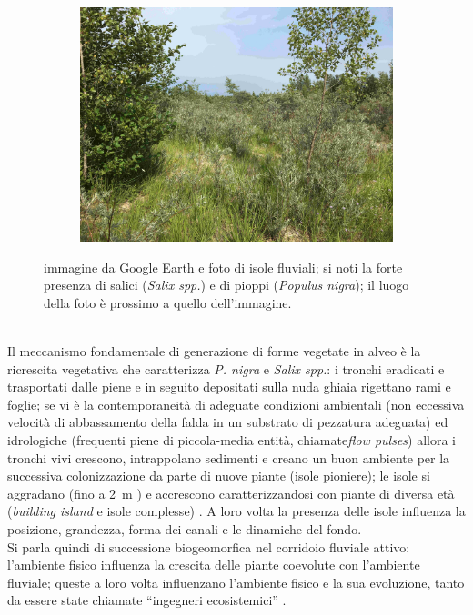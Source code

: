 \begin{figure}
\begin{subfigure}[b]{0.57\textwidth}
		\includegraphics[width=\textwidth]{files/esempio_isola_1.jpg}
	\end{subfigure}
	\caption[immagine e foto di isole fluviali]{immagine da Google Earth e foto di isole fluviali; si noti la forte presenza di salici (\emph{Salix spp.}) e di pioppi (\emph{Populus nigra}); il luogo della foto è prossimo a quello dell'immagine.}
	\label{fig:esempio-isola}
\end{figure}
%
\\
Il meccanismo fondamentale di generazione di forme vegetate in alveo è la ricrescita vegetativa che caratterizza \emph{P. nigra} e \emph{Salix spp.}: i tronchi eradicati e trasportati dalle piene e in seguito depositati sulla nuda ghiaia rigettano rami e foglie;
se vi è la contemporaneità di adeguate condizioni ambientali (non eccessiva velocità di abbassamento della falda in un substrato di pezzatura adeguata) ed idrologiche (frequenti piene di piccola-media entità, chiamate\emph{flow pulses}) allora i tronchi vivi crescono, intrappolano sedimenti e creano un buon ambiente per la successiva colonizzazione da parte di nuove piante (isole pioniere);
le isole si aggradano (fino a \SI{2}{\m} ) e accrescono caratterizzandosi con piante di diversa età (\emph{building island} e isole complesse) .
A loro volta la presenza delle isole influenza la posizione, grandezza, forma dei canali e le dinamiche del fondo.
\\
Si parla quindi di successione biogeomorfica nel corridoio fluviale attivo: l'ambiente fisico influenza la crescita delle piante coevolute con l'ambiente fluviale; queste a loro volta influenzano l'ambiente fisico e la sua evoluzione, tanto da essere state chiamate “ingegneri ecosistemici” .

